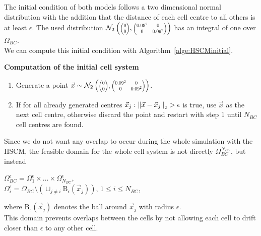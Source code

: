 The initial condition of both models follows a two dimensional normal distribution with the addition that the distance of each cell centre to all others is at least $\epsilon$.  
The used distribution $\mathcal{N}_2 \left( 
\scalebox{0.7}{$\begin{pmatrix} 0 \\ 0 \end{pmatrix}$}, 
\scalebox{0.7}{$\begin{pmatrix} 0.09^2 & 0 \\ 0 & 0.09^2 \end{pmatrix}$}
\right)$ has an integral of one over $\Omega_{BC}$. \\
We can compute this initial condition with Algorithm~\ref{alge:HSCMinitial}.
\begin{algorithm} \textbf{Computation of the initial cell system} \label{alge:HSCMinitial}
	\begin{enumerate} 
		\item Generate a point $\vec{x} \sim \mathcal{N}_2 \left( 
\scalebox{0.7}{$\begin{pmatrix} 0 \\ 0 \end{pmatrix}$}, 
\scalebox{0.7}{$\begin{pmatrix} 0.09^2 & 0 \\ 0 & 0.09^2 \end{pmatrix}$}
\right)$. 
		\item If for all already generated centres $\vec{x}_j: \norm[\vec{x} - \vec{x}_j] > \epsilon$ is true, use $\vec{x}$ as the next cell centre, otherwise discard the point and restart with step 1 until $N_{BC}$ cell centres are found. 
	\end{enumerate}	
\end{algorithm}

Since we do not want any overlap to occur during the whole simulation with the HSCM, the feasible domain for the whole cell system is not directly $\Omega_{BC}^{N_{BC}}$, but instead 
\begin{center}
    $\Omega_{BC}^{\epsilon} = \Omega_1^{\epsilon} \times \ldots \times \Omega_{N_{BC}}^{\epsilon}$, \\
    $\Omega_{i}^{\epsilon} = \Omega_{BC} \setminus ( \cup_{j \neq i} \mathrm{B}_{\epsilon}(\vec{x}_j))$, \hspace{0.5em} $1 \leq i \leq N_{BC}$,
\end{center}
where $\mathrm{B}_{\epsilon}(\vec{x}_j)$ denotes the ball around $\vec{x}_j$ with radius $\epsilon$. \\
This domain prevents overlaps between the cells by not allowing each cell to drift closer than $\epsilon$ to any other cell.  

